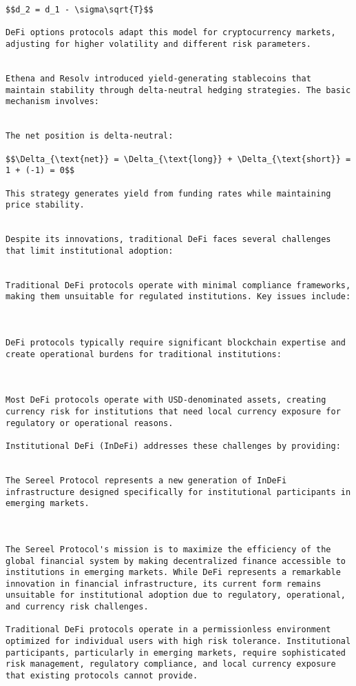 \documentclass[12pt]{article}
\begin{document}
{{{\begin{itemize}
\begin{lstlisting}
$$d_2 = d_1 - \sigma\sqrt{T}$$

DeFi options protocols adapt this model for cryptocurrency markets, adjusting for higher volatility and different risk parameters.


Ethena and Resolv introduced yield-generating stablecoins that maintain stability through delta-neutral hedging strategies. The basic mechanism involves:


The net position is delta-neutral:

$$\Delta_{\text{net}} = \Delta_{\text{long}} + \Delta_{\text{short}} = 1 + (-1) = 0$$

This strategy generates yield from funding rates while maintaining price stability.


Despite its innovations, traditional DeFi faces several challenges that limit institutional adoption:


Traditional DeFi protocols operate with minimal compliance frameworks, making them unsuitable for regulated institutions. Key issues include:



DeFi protocols typically require significant blockchain expertise and create operational burdens for traditional institutions:



Most DeFi protocols operate with USD-denominated assets, creating currency risk for institutions that need local currency exposure for regulatory or operational reasons.

Institutional DeFi (InDeFi) addresses these challenges by providing:


The Sereel Protocol represents a new generation of InDeFi infrastructure designed specifically for institutional participants in emerging markets.



The Sereel Protocol's mission is to maximize the efficiency of the global financial system by making decentralized finance accessible to institutions in emerging markets. While DeFi represents a remarkable innovation in financial infrastructure, its current form remains unsuitable for institutional adoption due to regulatory, operational, and currency risk challenges.

Traditional DeFi protocols operate in a permissionless environment optimized for individual users with high risk tolerance. Institutional participants, particularly in emerging markets, require sophisticated risk management, regulatory compliance, and local currency exposure that existing protocols cannot provide.


\end{lstlisting}
\end{itemize}}}}
\end{document}
